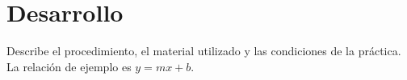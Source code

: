 \section{Desarrollo}
Describe el procedimiento, el material utilizado y las condiciones de la práctica.
La relación de ejemplo es \( y = mx + b \).

